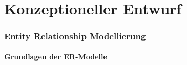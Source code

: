 \part{Konzeptioneller Entwurf}
    
\section{Entity Relationship Modellierung}
\subsection{Grundlagen der ER-Modelle}











